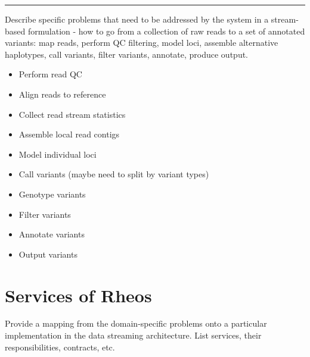\hrule
Describe specific problems that need to be addressed by the system in a stream-based formulation - how to go from a collection of raw reads to a set of annotated variants: map reads, perform QC filtering, model loci, assemble alternative haplotypes, call variants, filter variants, annotate, produce output.  


\begin{itemize}
    \item Perform read QC
    \item Align reads to reference
    \item Collect read stream statistics
    \item Assemble local read contigs
    \item Model individual loci
    \item Call variants (maybe need to split by variant types)
    \item Genotype variants
    \item Filter variants
    \item Annotate variants
    \item Output variants
\end{itemize}




\section{Services of Rheos}

Provide a mapping from the domain-specific problems onto a particular implementation in the data streaming architecture. List services, their responsibilities, contracts, etc.

